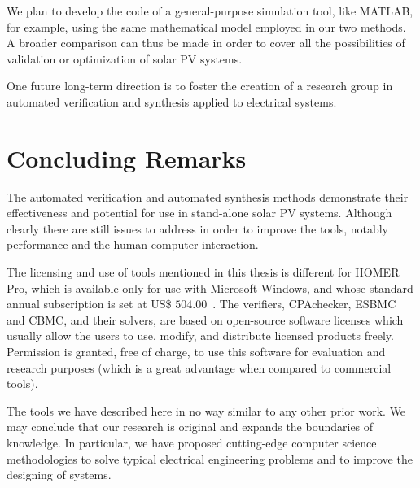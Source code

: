 We plan to develop the code of a general-purpose simulation tool, like MATLAB, for example, using the same mathematical model employed in our two methods. A broader comparison can thus be made in order to cover all the possibilities of validation or optimization of  solar PV systems.

One future long-term direction is to foster the creation of a research group in automated verification and synthesis applied to electrical systems.

\section{Concluding Remarks}

The automated verification and automated synthesis methods demonstrate their effectiveness and potential for use in stand-alone solar PV systems. Although clearly there are still issues to address in order to improve the tools, notably performance and the human-computer interaction.

The licensing and use of tools mentioned in this thesis is different for HOMER Pro, which is available only for use with Microsoft Windows, and whose standard annual subscription is set at US\$ $504.00$~\cite{HOMER}. The verifiers, CPAchecker, ESBMC and CBMC, and their solvers, are based on open-source software licenses which usually allow the users to use, modify, and distribute licensed products freely. Permission is granted, free of charge, to use this software for evaluation and research purposes (which is a great advantage when compared to commercial tools).

The tools we have described here in no way similar to any other prior work.  We may conclude that our research is original and expands the boundaries of knowledge. In particular, we have proposed cutting-edge computer science methodologies to solve typical electrical engineering problems and to improve the designing of systems.

